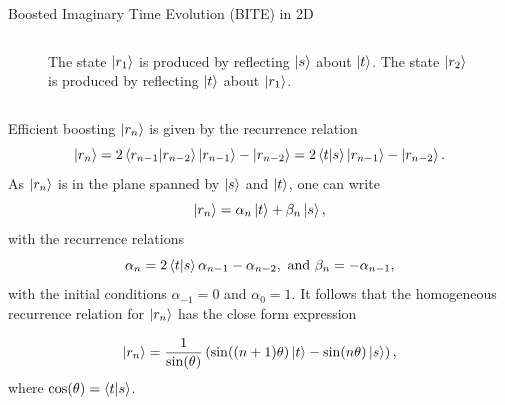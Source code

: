 \documentclass[final,hyperref={pdfpagelabels=false},mathserif]{beamer}
\begin{document}
\begin{columns}[t]
\begin{column}{40cm}
\begin{block}{Boosted Imaginary Time Evolution (BITE) in 2D}
\begin{columns}[c]

\begin{figure}[H]
\centering
{}
\caption{The state $\ket{r_1}$ is  produced by reflecting $\ket{s}$ about $\ket{t}$. The state $\ket{r_2}$ is  produced by reflecting $\ket{t}$ about $\ket{r_1}$.}
\label{const-2}
\end{figure}

\end{columns}

\end{block}

\begin{block}{Efficient boosting}
$\ket{r_n}$ is given by the recurrence relation
\begin{equation}
    \ket{r_n} = 2\braket{r_{n-1}}{r_{n-2}}\ket{r_{n-1}} - \ket{r_{n-2}} = 2\braket{t}{s}\ket{r_{n-1}} - \ket{r_{n-2}}. 
\notag
\end{equation}
\newline
As $\ket{r_n}$ is in the plane spanned by $\ket{s}$ and $\ket{t}$, one can write
\begin{equation}
    \ket{r_n} = \alpha_n\ket{t} + \beta_n\ket{s},
\notag
\end{equation}
with the recurrence relations
\begin{equation}
    \alpha_n = 2\braket{t}{s}\alpha_{n-1} - \alpha_{n-2}, \text{ and }
    \beta_n = -\alpha_{n-1}, 
\notag
\end{equation}
with the initial conditions $\alpha_{-1} = 0$ and  $\alpha_0 = 1$. It follows that the homogeneous recurrence relation for $\ket{r_n}$ has the close form expression

\begin{equation}
    \ket{r_n} = \frac{1}{\sin(\theta)}\left( 
    \sin((n+1)\theta) \ket{t} - \sin(n\theta)\ket{s}
    \right), 
\notag
\end{equation}
\vskip -5pt
where $\cos(\theta)=\braket{t}{s}$.


\end{block}
\end{column}
\end{columns}
\end{document}
